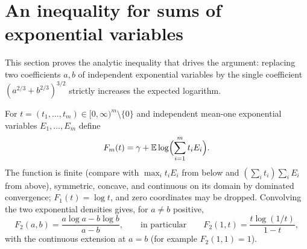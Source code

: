 \documentclass[11pt,a4paper]{article}
\theoremstyle{remark}
\newcommand{\E}{\mathbb E}
\begin{document}
\section{An inequality for sums of exponential variables}\label{sec:exp}
This section proves the analytic inequality that drives the argument: replacing two coefficients $a,b$ of independent exponential variables by the single coefficient $(a^{2/3}+b^{2/3})^{3/2}$ strictly increases the expected logarithm.

For $t=(t_1,\dots,t_m)\in[0,\infty)^m\setminus\{0\}$ and independent mean-one exponential variables $E_1,\dots,E_m$ define
\[
 F_m(t)=\gamma+\E\log\Bigl(\sum_{i=1}^mt_iE_i\Bigr).
\]
The function is finite (compare with $\max_it_iE_i$ from below and $(\sum_it_i)\sum_iE_i$ from above), symmetric, concave, and continuous on its domain by dominated convergence; $F_1(t)=\log t$, and zero coordinates may be dropped. Convolving the two exponential densities gives, for $a\ne b$ positive,
\begin{equation}\label{eq:F2}
 F_2(a,b)=\frac{a\log a-b\log b}{a-b},\qquad\text{in particular}\qquad F_2(1,t)=\frac{t\log(1/t)}{1-t},
\end{equation}
with the continuous extension at $a=b$ (for example $F_2(1,1)=1$).
\end{document}

